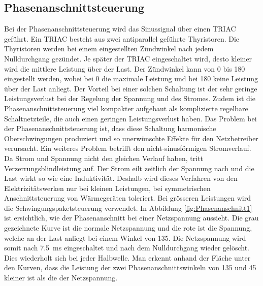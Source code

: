 \subsection{Phasenanschnittsteuerung}\label{sec:Phasenanschnittsteuerung}
Bei der Phasenanschnittsteuerung wird das Sinussignal über einen TRIAC geführt. Ein TRIAC besteht aus zwei antiparallel geführte Thyristoren. Die Thyristoren werden bei einem eingestellten Zündwinkel nach jedem Nulldurchgang gezündet. Je später der TRIAC eingeschaltet wird, desto kleiner wird die mittlere Leistung über der Last. Der Zündwinkel kann von 0\textdegree \hspace{0.02cm} bis 180\textdegree \hspace{0.02cm} eingestellt werden, wobei bei 0\textdegree \hspace{0.02cm} die maximale Leistung und bei 180\textdegree \hspace{0.02cm} keine Leistung über der Last anliegt. Der Vorteil bei einer solchen Schaltung ist der sehr geringe Leistungsverlust bei der Regelung der Spannung und des Stromes. Zudem ist die Phasenanschnittsteuerung viel kompakter aufgebaut als komplizierte regelbare Schaltnetzteile, die auch einen geringen Leistungsverlust haben.
Das Problem bei der Phasenanschnittsteuerung ist, dass diese Schaltung harmonische Oberschwingungen produziert und so unerwünschte Effekte für den Netzbetreiber verursacht. Ein weiteres Problem betrifft den nicht-sinusförmigen Stromverlauf. Da Strom und Spannung nicht den gleichen Verlauf haben, tritt Verzerrungsblindleistung auf. Der Strom eilt zeitlich der Spannung nach und die Last wirkt so wie eine Induktivität. Deshalb wird dieses Verfahren von den Elektrizitätswerken nur bei kleinen Leistungen, bei symmetrischen Anschnittsteuerung von Wärmegeräten toleriert. Bei grösseren Leistungen wird die Schwingungspaketsteuerung verwendet. In Abbildung \ref{fig:Phasenanschnitt1} ist ersichtlich, wie der Phasenanschnitt bei einer Netzspannung aussieht. Die grau gezeichnete Kurve ist die normale Netzspannung und die rote ist die Spannung, welche an der Last anliegt bei einem Winkel von 135\textdegree\hspace{0.02cm}. Die Netzspannung wird somit nach \SI{7.5}{ms} eingeschaltet und nach dem Nulldurchgang wieder gelöscht. Dies wiederholt sich bei jeder Halbwelle. Man erkennt anhand der Fläche unter den Kurven, dass die Leistung der zwei Phasenanschnittswinkeln von 135\textdegree\hspace{0.02cm} und 45\textdegree\hspace{0.02cm} kleiner ist als die der Netzspannung. 

